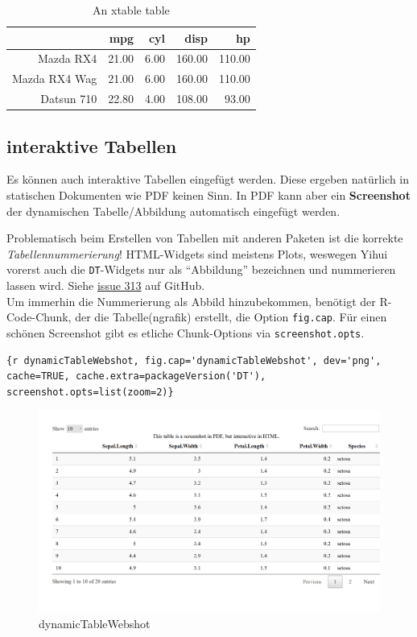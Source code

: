 \documentclass[]{book}
\theoremstyle{definition}
\theoremstyle{definition}
\theoremstyle{remark}
\begin{document}
\begin{table}[ht]
\centering
\begin{tabular}{rrrrr}
  \hline
 & mpg & cyl & disp & hp \\ 
  \hline
Mazda RX4 & 21.00 & 6.00 & 160.00 & 110.00 \\ 
  Mazda RX4 Wag & 21.00 & 6.00 & 160.00 & 110.00 \\ 
  Datsun 710 & 22.80 & 4.00 & 108.00 & 93.00 \\ 
   \hline
\end{tabular}
\caption{\label{tab:xTable} An xtable table} 
\label{xTableInternLabel}
\end{table}

\subsection{interaktive Tabellen}\label{interactiveTable}

Es können auch interaktive Tabellen eingefügt werden. Diese ergeben
natürlich in statischen Dokumenten wie PDF keinen Sinn. In PDF kann aber
ein \textbf{Screenshot} der dynamischen Tabelle/Abbildung automatisch
eingefügt werden.

Problematisch beim Erstellen von Tabellen mit anderen Paketen ist die
korrekte \emph{Tabellennummerierung}! HTML-Widgets sind meistens Plots,
weswegen Yihui vorerst auch die \texttt{DT}-Widgets nur als
``Abbildung'' bezeichnen und nummerieren lassen wird. Siehe
\href{https://github.com/rstudio/bookdown/issues/313}{issue 313} auf
GitHub.\\
Um immerhin die Nummerierung als Abbild hinzubekommen, benötigt der
R-Code-Chunk, der die Tabelle(ngrafik) erstellt, die Option
\texttt{fig.cap}. Für einen schönen Screenshot gibt es etliche
Chunk-Options via \texttt{screenshot.opts}.

\begin{verbatim}
{r dynamicTableWebshot, fig.cap='dynamicTableWebshot', dev='png', cache=TRUE, cache.extra=packageVersion('DT'), screenshot.opts=list(zoom=2)}
\end{verbatim}

\begin{figure}[htbp]
\centering
\includegraphics{img/dynamicTableWebshot-1.png}
\caption{\label{fig:dynamicTableWebshot}dynamicTableWebshot}
\end{figure}
\end{document}
